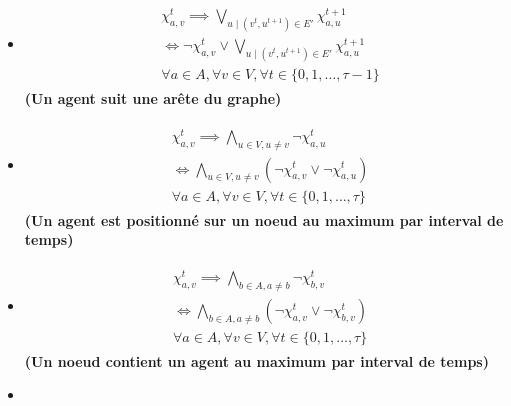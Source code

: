\documentclass[french, 12pt, letterpaper]{article}
\theoremstyle{definition}
\theoremstyle{proposition}
\theoremstyle{example}
\begin{document}
    \begin{itemize}
        \item[] 
            \begin{align}
                \label{equ:contrainteA}
                \begin{split}
                    &\chi_{a, v}^t \implies \bigvee_{u\;|\;( v^t, u^{t+1} ) \in E'} \chi_{a, u}^{t+1}
                    \\&\iff \lnot \chi_{a, v}^t \lor \bigvee_{u\;|\;( v^t, u^{t+1} ) \in E'} \chi_{a, u}^{t+1}
                    \\&\forall a \in A, \forall v \in V, \forall t \in \{0, 1, \ldots, \tau-1\}
                \end{split}
            \end{align}
            \textbf{(Un agent suit une arête du graphe)}
        \item[] 
            \begin{align}
                \label{equ:contrainteB}
                \begin{split}
                    &\chi_{a, v}^t \implies \bigwedge_{u \in V, u \neq v} \lnot \chi_{a, u}^t
                    \\&\iff \bigwedge_{u \in V, u \neq v} (\lnot \chi_{a, v}^t \lor \lnot \chi_{a, u}^t)
                    \\&\forall a \in A, \forall v \in V, \forall t \in \{0, 1, \ldots, \tau\}
                \end{split}
            \end{align}
            \textbf{(Un agent est positionné sur un noeud au maximum par interval de temps)}
        \item[] 
            \begin{align}
                \label{equ:contrainteC}
                \begin{split}
                    &\chi_{a, v}^t \implies \bigwedge_{b \in A, a \neq b} \lnot \chi_{b, v}^t
                    \\&\iff \bigwedge_{b \in A, a \neq b} (\lnot \chi_{a, v}^t \lor \lnot \chi_{b, v}^t)
                    \\&\forall a \in A, \forall v \in V, \forall t \in \{0, 1, \ldots, \tau\}
                \end{split}
            \end{align}
            \textbf{(Un noeud contient un agent au maximum par interval de temps)}
        \item[] 
            \begin{align}

\end{align}
\end{itemize}
\end{document}
